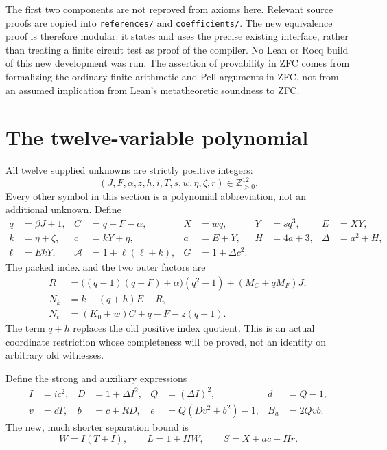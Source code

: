 \documentclass[11pt]{article}
\theoremstyle{remark}\newtheorem{remark}[theorem]{Remark}
\newcommand{\Pos}{\mathbb Z_{>0}}\newcommand{\Con}{\operatorname{Con}}
\begin{document}
The first two components are not reproved from axioms here. Relevant source
proofs are copied into \texttt{references/} and \texttt{coefficients/}.
The new equivalence proof is therefore modular: it states and uses the
precise existing interface, rather than treating a finite circuit test as
proof of the compiler. No Lean or Rocq build of this new development was run.
The assertion of provability in ZFC comes from formalizing the ordinary
finite arithmetic and Pell arguments in ZFC, not from an assumed implication
from Lean's metatheoretic soundness to ZFC.

\section{The twelve-variable polynomial}
\label{sec:definition}

All twelve supplied unknowns are strictly positive integers:
\[
 (J,F,\alpha,z,h,i,T,s,w,\eta,\zeta,r)\in\Pos^{12}.
\]
Every other symbol in this section is a polynomial abbreviation, not an
additional unknown. Define
\begin{align*}
 q&=\beta J+1,& C&=q-F-\alpha,&X&=wq,&Y&=sq^3,& E&=XY,\\
 k&=\eta+\zeta,&c&=kY+\eta,&a&=E+Y,&H&=4a+3,&\Delta&=a^2+H,\\
 \ell&=EkY,&\mathcal A&=1+\ell(\ell+k),&G&=1+\Delta c^2.
\end{align*}
The packed index and the two outer factors are
\begin{align}
 R&=\bigl((q-1)(q-F)+\alpha\bigr)(q^2-1)+(M_C+qM_F)J,\label{eq:R}\\
 N_k&=k-(q+h)E-R,\label{eq:Nk}\\
 N_t&=(K_0+w)C+q-F-z(q-1).\label{eq:Nt}
\end{align}
The term $q+h$ replaces the old positive index quotient. This is an actual
coordinate restriction whose completeness will be proved, not an identity
on arbitrary old witnesses.

Define the strong and auxiliary expressions
\begin{align*}
 I&=ic^2,&D&=1+\Delta I^2,&Q&=(\Delta I)^2,&d&=Q-1,\\
 v&=cT,&b&=c+RD,&e&=Q(Dv^2+b^2)-1,&B_a&=2Qvb.
\end{align*}
The new, much shorter separation bound is
\begin{equation}
 \boxed{\quad W=I(T+I),\qquad L=1+HW,\qquad S=X+ac+Hr.\quad}
 \label{eq:weight}
\end{equation}
\end{document}
